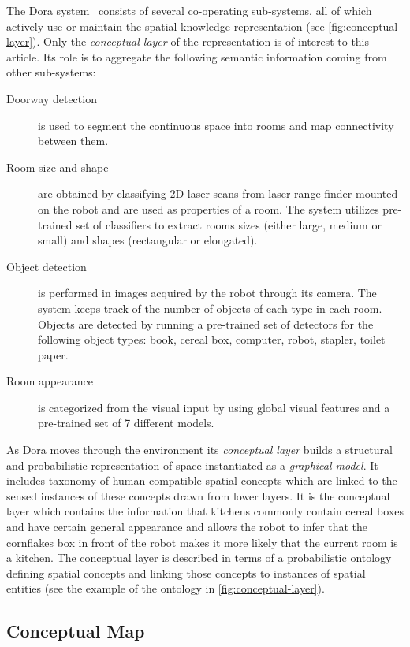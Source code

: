 \documentclass[runningheads,a4paper]{llncs}
\begin{document}
The Dora system~\cite{ijcai} consists of several co-operating sub-systems,
all of which actively use or maintain the spatial knowledge representation
(see \autoref{fig:conceptual-layer}).
Only the \emph{conceptual layer} of the representation is of interest to this article.
Its role is to aggregate the following semantic information coming from other sub-systems:
\begin{description}
 \item[Doorway detection] is used to segment the continuous space into rooms and map connectivity between them.
 \item[Room size and shape] are obtained by classifying 2D laser scans from laser range finder mounted on the robot and are used as properties of a room. The system utilizes pre-trained set of classifiers to extract rooms sizes (either large, medium or small) and shapes (rectangular or elongated).
 \item[Object detection] is performed in images acquired by the robot through its camera. The system keeps track of the number of objects of each type in each room. Objects are detected by running a pre-trained set of detectors for the following object types: book, cereal box, computer, robot, stapler, toilet paper.
 \item[Room appearance] is categorized from the visual input by using global visual features and a pre-trained set of 7 different models.
\end{description}

As Dora moves through the environment its \emph{conceptual layer} builds a structural and
probabilistic representation of space instantiated as a \emph{graphical model}.
It includes taxonomy of human-compatible spatial concepts which are linked to the sensed 
instances of these concepts drawn from lower layers. It is the conceptual layer which 
contains the information that kitchens commonly contain cereal boxes and have certain 
general appearance and allows the robot to infer that the cornflakes box in front of the 
robot makes it more likely that the current room is a kitchen. The conceptual layer is 
described in terms of a probabilistic ontology defining spatial concepts and linking 
those concepts to instances of spatial entities (see the example of the ontology in
\autoref{fig:conceptual-layer}).

\subsection{Conceptual Map}
\end{document}
